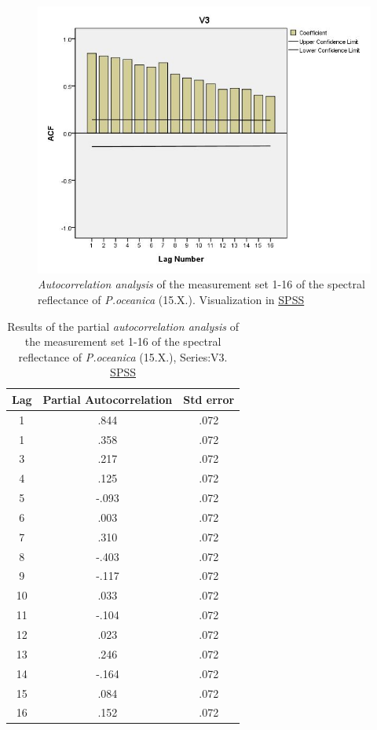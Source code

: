 \documentclass[11pt]{article}
\begin{document}
\begin{appendices}
\begin{figure}[H]
	\centering
	\includegraphics[scale=0.45]{Autocorr.jpg}
	\caption{\textit{Autocorrelation analysis} of the measurement set 1-16 of the spectral reflectance of \textit{P.oceanica} (15.X.). Visualization in \href{http://www.spss.com/}{SPSS}}
	\label{fig:A.21}
\end{figure}
\pagebreak
\newpage

\begin{table}[htbp]
	\caption{Results of the partial \textit{autocorrelation analysis} of the measurement set 1-16 of the spectral reflectance of \textit{P.oceanica} (15.X.), Series:V3. \href{http://www.spss.com/}{SPSS}}\label{tab:14}
	\begin{center}
	\begin{tabular}{|c|c|c|}
		\hline\hline
			Lag & Partial Autocorrelation & Std error\\ \hline\hline
			1 & .844 & .072 \\ \hline
			1 &.358 & .072 \\ \hline
			3 & .217 &.072 \\ \hline
			4 & .125 &.072 \\ \hline
			5 & -.093 & .072 \\ \hline
			6 & .003 & .072 \\ \hline
			7 & .310 & .072 \\ \hline
			8 & -.403 & .072 \\ \hline
			9 & -.117 & .072 \\ \hline
			10 & .033 & .072 \\ \hline
			11 & -.104 & .072 \\ \hline
			12 & .023 &.072 \\ \hline
			13 & .246 &.072 \\ \hline
			14 & -.164 & .072 \\ \hline
			15 & .084 & .072 \\ \hline
			16 & .152 & .072 \\ \hline
	\end{tabular}
	\end{center}
\end{table}


\end{appendices}
\end{document}

